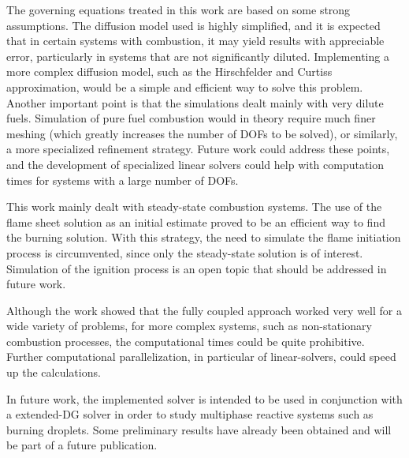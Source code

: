 The governing equations treated in this work are based on some strong assumptions.
The diffusion model used is highly simplified, and it is expected that in certain systems with combustion, it may yield results with appreciable error, particularly in systems that are not significantly diluted. Implementing a more complex diffusion model, such as the Hirschfelder and Curtiss approximation, would be a simple and efficient way to solve this problem. 
Another important point is that the simulations dealt mainly with very dilute fuels. Simulation of pure fuel combustion would in theory require much finer meshing (which greatly increases the number of DOFs to be solved), or similarly, a more specialized refinement strategy. Future work could address these points, and the development of specialized linear solvers could help with computation times for systems with a large number of DOFs.

This work mainly dealt with steady-state combustion systems. The use of the flame sheet solution as an initial estimate proved to be an efficient way to find the burning solution. With this strategy, the need to simulate the flame initiation process is circumvented, since only the steady-state solution is of interest.  Simulation of the ignition process is an open topic that should be addressed in future work. 

Although the work showed that the fully coupled approach worked very well for a wide variety of problems, for more complex systems, such as non-stationary combustion processes, the computational times could be quite prohibitive. Further computational parallelization, in particular of linear-solvers, could speed up the calculations. 

In future work, the implemented solver is intended to be used in conjunction with a extended-DG solver \parencite{kummerExtendedDiscontinuousGalerkin2017,kummerBoSSSPackageMultigrid2021,krauseIncompressibleImmersedBoundary2017} in order to study multiphase reactive systems such as burning droplets. Some preliminary results have already been obtained and will be part of a future publication.

